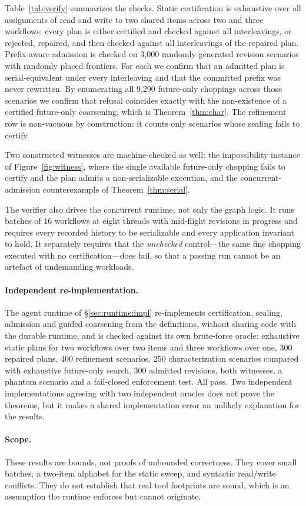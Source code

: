 Table~\ref{tab:verify} summarizes the checks. Static certification is
exhaustive over all assignments of read and write to two shared items across
two and three workflows: every plan is either certified and checked against
all interleavings, or rejected, repaired, and then checked against all
interleavings of the repaired plan. Prefix-aware admission is checked on
3{,}000 randomly generated revision scenarios with randomly placed frontiers.
For each we confirm that an admitted plan is serial-equivalent under every
interleaving and that the committed prefix was never rewritten. By enumerating
all 9{,}290 future-only choppings across those scenarios we confirm that
refusal coincides exactly with the non-existence of a certified future-only
coarsening, which is Theorem~\ref{thm:char}. The refinement row is
non-vacuous by construction: it counts only scenarios whose sealing fails to
certify.

Two constructed witnesses are machine-checked as well: the impossibility
instance of Figure~\ref{fig:witness}, where the single available future-only
chopping fails to certify and the plan admits a non-serializable execution,
and the concurrent-admission counterexample of Theorem~\ref{thm:serial}.

The verifier also drives the concurrent runtime, not only the graph logic. It
runs batches of 16 workflows at eight threads with mid-flight revisions in
progress and requires every recorded history to be serializable and every
application invariant to hold. It separately requires that the
\emph{unchecked} control---the same fine chopping executed with no
certification---does fail, so that a passing run cannot be an artefact of
undemanding workloads.

\paragraph{Independent re-implementation.}
The agent runtime of \S\ref{sec:runtime:impl} re-implements certification,
sealing, admission and guided coarsening from the definitions, without sharing
code with the durable runtime, and is checked against its own brute-force
oracle: exhaustive static plans for two workflows over two items and three
workflows over one, 300 repaired plans, 400 refinement scenarios, 250 characterization scenarios compared with
exhaustive future-only search, 300 admitted revisions, both witnesses, a
phantom scenario and a fail-closed enforcement test. All pass. Two independent
implementations agreeing with two independent oracles does not prove the
theorems, but it makes a shared implementation error an unlikely explanation
for the results.

\paragraph{Scope.}
These results are bounds, not proofs of unbounded correctness. They cover
small batches, a two-item alphabet for the static sweep, and syntactic
read/write conflicts. They do not establish that real tool footprints are
sound, which is an assumption the runtime enforces but cannot originate.
